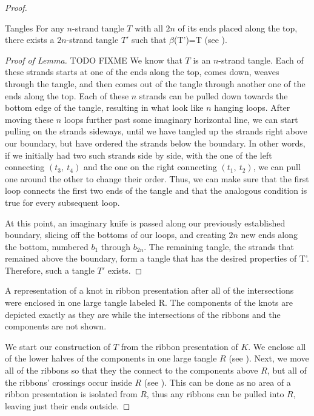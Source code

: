 \begin{paper}
\begin{proof}
\begin{paperlem}{Tangles}
For any $n$-strand tangle $T$ with all $2n$ of its ends placed along the top,
there exists a $2n$-strand tangle $T'$ such that $\beta$(T')=T (see \figLemma).
\end{paperlem}
\begin{proof}[Proof of Lemma] TODO FIXME
We know that $T$ is an $n$-strand tangle.
Each of these strands starts at one of the ends along the top, comes down,
weaves through the tangle, and then comes out of the tangle through another one
of the ends along the top.
Each of these $n$ strands can be pulled down towards the bottom edge of the
tangle, resulting in what look like $n$ hanging loops.
After moving these $n$ loops further past some imaginary horizontal line, we can
start pulling on the strands sideways, until we have tangled up the strands
right above our boundary, but have ordered the strands below the boundary.
In other words, if we initially had two such strands side by side, with the one
of the left connecting $(t_3,~t_4)$ and the one on the right connecting
$(t_1,~t_2)$, we can pull one around the other to change their order.
Thus, we can make sure that the first loop connects the first two ends of the
tangle and that the analogous condition is true for every subsequent loop.

At this point, an imaginary knife is passed along our previously established
boundary, slicing off the bottoms of our loops, and creating $2n$ new ends along
the bottom, numbered $b_1$ through $b_{2n}$.
The remaining tangle, the strands that remained above the boundary, form a
tangle that has the desired properties of T'.
Therefore, such a tangle $T'$ exists.
\end{proof}

{A representation of a knot in ribbon presentation after all of the
intersections were enclosed in one large tangle labeled R.
The components of the knots are depicted exactly as they are while the
intersections of the ribbons and the components are not shown.}

We start our construction of $T$ from the ribbon presentation of $K$.
We enclose all of the lower halves of the components in one large tangle $R$
(see \figPresentation).
Next, we move all of the ribbons so that they the connect to the components
above $R$, but all of the ribbons' crossings occur inside $R$ (see \figLowered).
This can be done as no area of a ribbon presentation is isolated from $R$, thus
any ribbons can be pulled into $R$, leaving just their ends outside.


\end{proof}
\end{paper}
